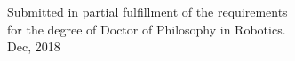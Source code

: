 \begin{center}
\vspace{1.5cm}
Submitted in partial fulfillment of the requirements\\
for the degree of Doctor of Philosophy in Robotics.\\
Dec, 2018\\
\vspace{50pt}
\vspace{10pt}


\end{center}

\pagebreak